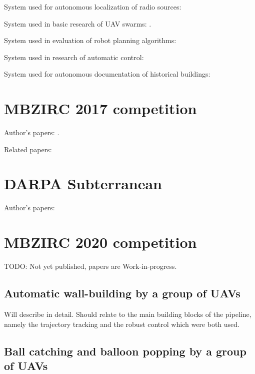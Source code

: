 \documentclass[a4paper,11pt,titlepage,twoside]{book}
\begin{document}
System used for autonomous localization of radio sources: \cite{vrba2019realtime}

System used in basic research of UAV swarms: \cite{saska2020formation}.

System used in evaluation of robot planning algorithms: \cite{penicka2019data, faigl2019unsupervised, penicka2017dubins, spurny2019cooperative, petrlik2019coverage, faigl2017onsolution, spurny2016complex}

System used in research of automatic control: \cite{giernacky2019realtime, saikin2020wildfire}

System used for autonomous documentation of historical buildings: \cite{petracek2020dronument, saska2017documentation}

\section{MBZIRC 2017 competition}

Author's papers: \cite{baca2019autonomous, spurny2019cooperative, loianno2018localization}.

Related papers: \cite{faigl2019unsupervised, stepan2019vision}

\section{DARPA Subterranean}

Author's papers: \cite{petrlik2020robust, roucek2019darpa}

\section{MBZIRC 2020 competition}

TODO: Not yet published, papers are Work-in-progress.

\subsection{Automatic wall-building by a group of UAVs}

Will describe in detail. Should relate to the main building blocks of the pipeline, namely the trajectory tracking \cite{baca2018model} and the robust control \cite{petrlik2020robust} which were both used.

\subsection{Ball catching and balloon popping by a group of UAVs}
\end{document}
